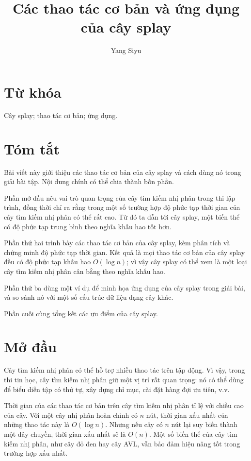 \documentclass[11pt]{article}
\title{Các thao tác cơ bản và ứng dụng của cây splay}
\author{Yang Siyu}
\date{}
\begin{document}
\maketitle


\section*{Từ khóa}

Cây splay; thao tác cơ bản; ứng dụng.

\section*{Tóm tắt}

Bài viết này giới thiệu các thao tác cơ bản của cây splay và cách dùng nó
trong giải bài tập. Nội dung chính có thể chia thành bốn phần.

Phần mở đầu nêu vai trò quan trọng của cây tìm kiếm nhị phân trong thi lập
trình, đồng thời chỉ ra rằng trong một số trường hợp độ phức tạp thời gian
của cây tìm kiếm nhị phân có thể rất cao. Từ đó ta dẫn tới cây splay, một
biến thể có độ phức tạp trung bình theo nghĩa khấu hao tốt hơn.

Phần thứ hai trình bày các thao tác cơ bản của cây splay, kèm phân tích và
chứng minh độ phức tạp thời gian. Kết quả là mọi thao tác cơ bản của cây
splay đều có độ phức tạp khấu hao $O(\log n)$; vì vậy cây splay có thể xem
là một loại cây tìm kiếm nhị phân cân bằng theo nghĩa khấu hao.

Phần thứ ba dùng một ví dụ để minh họa ứng dụng của cây splay trong giải
bài, và so sánh nó với một số cấu trúc dữ liệu dạng cây khác.

Phần cuối cùng tổng kết các ưu điểm của cây splay.

\section{Mở đầu}

Cây tìm kiếm nhị phân có thể hỗ trợ nhiều thao tác trên tập động. Vì vậy,
trong thi tin học, cây tìm kiếm nhị phân giữ một vị trí rất quan trọng: nó
có thể dùng để biểu diễn tập có thứ tự, xây dựng chỉ mục, cài đặt hàng đợi
ưu tiên, v.v.

Thời gian của các thao tác cơ bản trên cây tìm kiếm nhị phân tỉ lệ với chiều
cao của cây. Với một cây nhị phân hoàn chỉnh có $n$ nút, thời gian xấu nhất
của những thao tác này là $O(\log n)$. Nhưng nếu cây có $n$ nút lại suy biến
thành một dây chuyền, thời gian xấu nhất sẽ là $O(n)$. Một số biến thể của
cây tìm kiếm nhị phân, như cây đỏ đen hay cây AVL, vẫn bảo đảm hiệu năng tốt
trong trường hợp xấu nhất.
\end{document}
